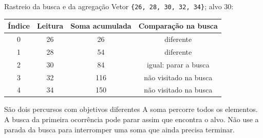 \begin{frame}{Rastreio da busca e da agregação}
Vetor \texttt{\{26, 28, 30, 32, 34\}}; alvo 30:
\begin{center}
\begin{tabular}{cccc}
\toprule
Índice & Leitura & Soma acumulada & Comparação na busca \\
\midrule
0 & 26 & 26 & diferente \\
1 & 28 & 54 & diferente \\
2 & 30 & 84 & igual: parar a busca \\
3 & 32 & 116 & não visitado na busca \\
4 & 34 & 150 & não visitado na busca \\
\bottomrule
\end{tabular}
\end{center}
\begin{block}{São dois percursos com objetivos diferentes}
A soma percorre todos os elementos. A busca da primeira ocorrência pode parar assim que encontra o alvo. Não use a parada da busca para interromper uma soma que ainda precisa terminar.
\end{block}
\end{frame}
